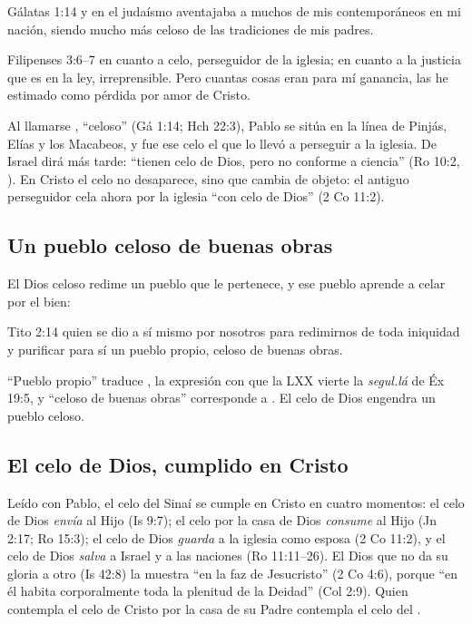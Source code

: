 \begin{verso}{Gálatas 1:14}
y en el judaísmo aventajaba a muchos de mis contemporáneos en mi nación, siendo mucho más celoso de las tradiciones de mis padres.
\end{verso}
\begin{verso}{Filipenses 3:6–7}
en cuanto a celo, perseguidor de la iglesia; en cuanto a la justicia que es en la ley, irreprensible. Pero cuantas cosas eran para mí ganancia, las he estimado como pérdida por amor de Cristo.
\end{verso}

Al llamarse , ``celoso'' (Gá 1:14; Hch 22:3), Pablo se sitúa en la línea de Pinjás, Elías y los Macabeos, y fue ese celo el que lo llevó a perseguir a la iglesia. De Israel dirá más tarde: ``tienen celo de Dios, pero no conforme a ciencia'' (Ro 10:2, ). En Cristo el celo no desaparece, sino que cambia de objeto: el antiguo perseguidor cela ahora por la iglesia ``con celo de Dios'' (2 Co 11:2).


\subsection{Un pueblo celoso de buenas obras}
El Dios celoso redime un pueblo que le pertenece, y ese pueblo aprende a celar por el bien:

\begin{verso}{Tito 2:14}
quien se dio a sí mismo por nosotros para redimirnos de toda iniquidad y purificar para sí un pueblo propio, celoso de buenas obras.
\end{verso}

``Pueblo propio'' traduce , la expresión con que la LXX vierte la \emph{segul.lá} de Éx 19:5, y ``celoso de buenas obras'' corresponde a . El celo de Dios engendra un pueblo celoso.


\subsection{El celo de Dios, cumplido en Cristo}
Leído con Pablo, el celo del Sinaí se cumple en Cristo en cuatro momentos: el celo de Dios \emph{envía} al Hijo (Is 9:7); el celo por la casa de Dios \emph{consume} al Hijo (Jn 2:17; Ro 15:3); el celo de Dios \emph{guarda} a la iglesia como esposa (2 Co 11:2), y el celo de Dios \emph{salva} a Israel y a las naciones (Ro 11:11--26). El Dios que no da su gloria a otro (Is 42:8) la muestra ``en la faz de Jesucristo'' (2 Co 4:6), porque ``en él habita corporalmente toda la plenitud de la Deidad'' (Col 2:9). Quien contempla el celo de Cristo por la casa de su Padre contempla el celo del \SENOR.

